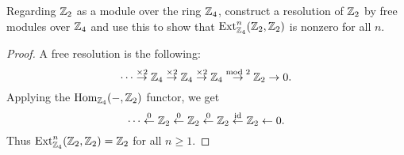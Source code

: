 \documentclass{article}
\begin{document}
 Regarding $\mathbb{Z}_2$ as a module over the ring $\mathbb{Z}_4$, construct a resolution of $\mathbb{Z}_2$ by free modules over $\mathbb{Z}_4$
and use this to show that $\operatorname{Ext}_{\mathbb{Z}_4}^n(\mathbb{Z}_2, \mathbb{Z}_2)$ is nonzero for all $n$.
\begin{proof}
A free resolution is the following:
$$ \cdots \overset{\times 2} \to \mathbb{Z}_4 \overset{\times 2} \to \mathbb{Z}_4 \overset{\times 2} \to \mathbb{Z}_4 \overset{\text{mod } 2} \to \mathbb{Z}_2 \to 0.$$
Applying the $\operatorname{Hom}_{\mathbb{Z}_4}(-, \mathbb{Z}_2)$ functor, we get
$$ \cdots \overset{0} \gets \mathbb{Z}_2 \overset{0} \gets  \mathbb{Z}_2  \overset{0} \gets \mathbb{Z}_2 \overset{\operatorname{id}} \gets \mathbb{Z}_2 \gets 0.$$
Thus $\operatorname{Ext}_{\mathbb{Z}_4}^n(\mathbb{Z}_2, \mathbb{Z}_2) = \mathbb{Z}_2$ for all $n \ge 1$.
\end{proof}
\end{document}

